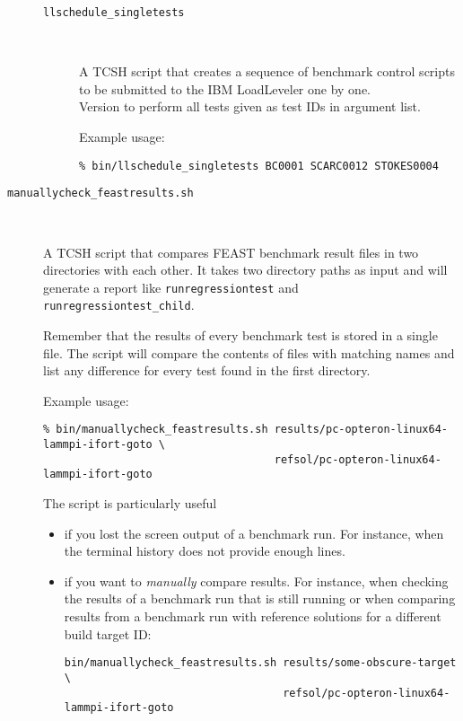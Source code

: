 \begin{description}
\begin{description}
  \item[\texttt{llschedule\_singletests}] \

    A TCSH script that creates a sequence of benchmark control scripts 
    to be submitted to the IBM LoadLeveler one by one. \\
    Version to perform all tests given as test IDs in argument list.

    Example usage:
\begin{verbatim}
% bin/llschedule_singletests BC0001 SCARC0012 STOKES0004
\end{verbatim}

  \end{description}

\item[\texttt{manuallycheck\_feastresults.sh}] \

A TCSH script that compares FEAST benchmark result files in two directories with
each other. It takes two directory paths as input and will generate a report
like \texttt{runregressiontest} and \\
\texttt{runregressiontest\_child}.

Remember that the results of every benchmark test is stored in a single
file. The script will compare the contents of files with matching names and
list any difference for every test found in the first directory.

Example usage:
\begin{verbatim}
% bin/manuallycheck_feastresults.sh results/pc-opteron-linux64-lammpi-ifort-goto \
                                    refsol/pc-opteron-linux64-lammpi-ifort-goto
\end{verbatim}

The script is particularly useful
\begin{itemize}
\item if you lost the screen output of a benchmark run. For instance, when the
  terminal history does not provide enough lines.
\item if you want to \emph{manually} compare results. For instance, when
  checking the results of a benchmark run that is still running or when
  comparing results from a benchmark run with reference solutions for a
  different build target ID:
\begin{verbatim}
bin/manuallycheck_feastresults.sh results/some-obscure-target \
                                  refsol/pc-opteron-linux64-lammpi-ifort-goto
\end{verbatim}



\end{itemize}
\end{description}
